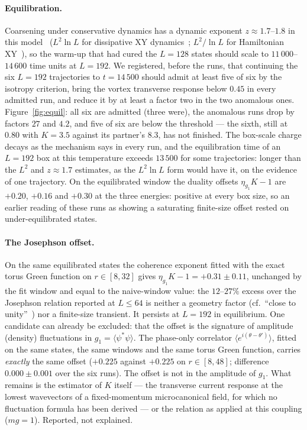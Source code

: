 \documentclass[11pt,a4paper]{article}
\begin{document}
\paragraph{Equilibration.} Coarsening under conservative dynamics has a dynamic exponent $z\approx1.7$--$1.8$ in
this model~\cite{GroszekBillam2026} ($L^2\ln L$ for dissipative XY dynamics~\cite{Bray2000,JelicCugliandolo2011};
$L^2/\ln L$ for Hamiltonian XY~\cite{Nam2012}), so the warm-up that had cured the $L=128$ states should scale to
$11\,000$--$14\,600$ time units at $L=192$. We registered, before the runs, that continuing the six $L=192$ trajectories
to $t=14\,500$ should admit at least five of six by the isotropy criterion, bring the vortex transverse response below
$0.45$ in every admitted run, and reduce it by at least a factor two in the two anomalous ones. Figure~\ref{fig:equil}:
all six are admitted (three were), the anomalous runs drop by factors $27$ and $4.2$, and five of six are below the
threshold --- the sixth, still at $0.80$ with $K=3.5$ against its partner's $8.3$, has not finished. The box-scale
charge decays as the mechanism says in every run, and the equilibration time of an $L=192$ box at this temperature
exceeds $13\,500$ for some trajectories: longer than the $L^2$ and $z\approx1.7$ estimates, as the $L^2\ln L$ form would
have it, on the evidence of one trajectory. On the equilibrated window the duality offsets $\eta_{g_1}K-1$ are $+0.20$,
$+0.16$ and $+0.30$ at the three energies: positive at every box size, so an earlier reading of these runs as showing
a saturating finite-size offset rested on under-equilibrated states.

\paragraph{The Josephson offset.} On the same equilibrated states the coherence exponent fitted with the exact torus
Green function on $r\in[8,32]$ gives $\eta_{g_1}K-1=+0.31\pm0.11$, unchanged by the fit window and equal to the
naive-window value: the $12$--$27\%$ excess over the Josephson relation reported at $L\le64$ is neither a geometry
factor (cf.\ ``close to unity''~\cite{HolzmannBaym2007}) nor a finite-size transient. It persists at $L=192$ in
equilibrium. One candidate can already be excluded: that the offset is the signature of amplitude (density) fluctuations in
$g_1=\langle\psi^*\psi\rangle$. The phase-only correlator $\langle e^{i(\theta-\theta')}\rangle$, fitted on the same
states, the same windows and the same torus Green function, carries \emph{exactly} the same offset ($+0.225$ against
$+0.225$ on $r\in[8,48]$; difference $0.000\pm0.001$ over the six runs). The offset is not in the amplitude of
$g_1$. What remains is the estimator of $K$ itself --- the transverse current response at the lowest wavevectors of
a fixed-momentum microcanonical field, for which no fluctuation formula has been derived --- or the relation as
applied at this coupling ($mg=1$). Reported, not explained.
\end{document}
